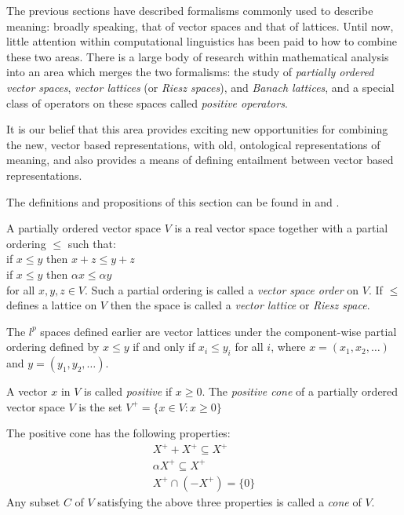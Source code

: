\documentclass[12pt]{report}
\begin{document}
The previous sections have described formalisms commonly used to describe meaning: broadly speaking, that of vector spaces and that of lattices. Until now, little attention within computational linguistics has been paid to how to combine these two areas. There is a large body of research within mathematical analysis into an area which merges the two formalisms: the study of \emph{partially ordered vector spaces}, \emph{vector lattices} (or \emph{Riesz spaces}), and \emph{Banach lattices}, and a special class of operators on these spaces called \emph{positive operators}.

It is our belief that this area provides exciting new opportunities for combining the new, vector based representations, with old, ontological representations of meaning, and also provides a means of defining entailment between vector based representations.

The definitions and propositions of this section can be found in \cite{Abramovich:02} and \cite{Aliprantis:85}.

\begin{defn}
A partially ordered vector space $V$ is a real vector space together with a partial ordering $\le$ such that:
\vspace{0.1cm}\\
\indent if $x \le y$ then $x + z \le y + z$\\
\indent if $x \le y$ then $\alpha x \le \alpha y$
\vspace{0.1cm}\\
for all $x,y,z \in V$. Such a partial ordering is called a \emph{vector space order} on $V$. If $\le$ defines a lattice on $V$ then the space is called a \emph{vector lattice} or \emph{Riesz space}.

\begin{example}
The $l^p$ spaces defined earlier are vector lattices under the component-wise partial ordering defined by $x \le y$ if and only if $x_i \le y_i$ for all $i$, where $x = (x_1, x_2, \ldots)$ and $y = (y_1, y_2, \ldots)$.
\end{example}


A vector $x$ in $V$ is called \emph{positive} if $x \ge 0$. The \emph{positive cone} of a partially ordered vector space $V$ is the set $V^+ = \{x \in V : x \ge 0\}$
\end{defn}

The positive cone has the following properties:
\begin{eqnarray*}
X^+ + X^+ \subseteq X^+\\
\alpha X^+ \subseteq X^+\\
X^+ \cap (-X^+) = \{0\}
\end{eqnarray*}
Any subset $C$ of $V$ satisfying the above three properties is called a \emph{cone} of $V$.
\end{document}
